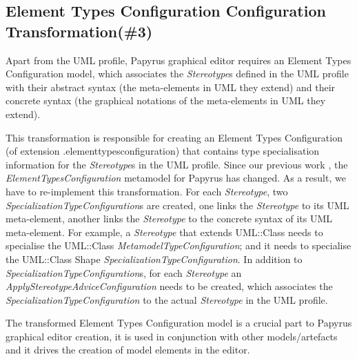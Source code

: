 \subsection{Element Types Configuration Configuration Transformation(\#3)}
\label{sec:elementTypes}
Apart from the UML profile, Papyrus graphical editor requires an Element Types Configuration model, which associates the \textit{Stereotype}s defined in the UML profile with their abstract syntax (the meta-elements in UML they extend) and their concrete syntax (the graphical notations of the meta-elements in UML they extend). 

This transformation is responsible for creating an Element Types Configuration (of extension .elementtypesconfiguration) that contains type specialisation information for the \textit{Stereotype}s in the UML profile. 
Since our previous work \cite{zolotas2018towards}, the \textit{ElementTypesConfiguration} metamodel for Papyrus has changed. 
As a result, we have to re-implement this transformation. 
For each \textit{Stereotype}, two \textit{SpecializationTypeConfiguration}s are created, one links the \textit{Stereotype} to its UML meta-element, another links the \textit{Stereotype} to the concrete syntax of its UML meta-element.
For example, a \textit{Stereotype} that extends UML::Class needs to specialise the UML::Class \textit{MetamodelTypeConfiguration}; and it needs to specialise the UML::Class Shape \textit{SpecializationTypeConfiguration}. 
In addition to \textit{SpecializationTypeConfiguration}s, for each \textit{Stereotype} an \textit{ApplyStereotypeAdviceConfiguration} needs to be created, which associates the \textit{SpecializationTypeConfiguration} to the actual \textit{Stereotype} in the UML profile.

The transformed Element Types Configuration model is a crucial part to Papyrus graphical editor creation, it is used in conjunction with other models/artefacts and it drives the creation of model elements in the editor.

